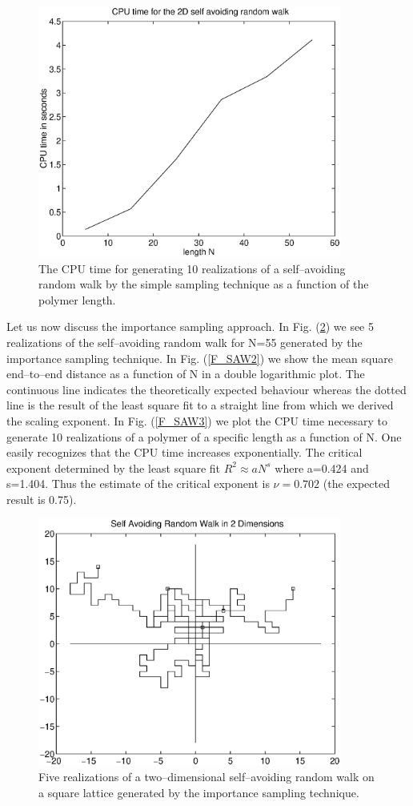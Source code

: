 \begin{figure}
\label{F_SAW3S}
\includegraphics[width=10cm]{./Figures/f_saw3s.eps}
\caption{The CPU time for generating 10 realizations  of a 
self--avoiding random walk  by the simple sampling
technique as a function of the polymer length.}
\end{figure}

Let us now discuss the importance sampling approach.
In Fig. (\ref{F_SAW1}) we see 5 realizations of the self--avoiding 
random walk for N=55 generated by the importance sampling technique. 
In Fig. (\ref{F_SAW2}) we show the mean square end--to--end 
distance as a function of N in a double logarithmic plot. The 
continuous line indicates the theoretically expected behaviour
whereas the dotted line is the result of the least square fit to a 
straight line from which we derived the scaling exponent. In 
Fig. (\ref{F_SAW3}) we plot the CPU time necessary to generate
10 realizations of a polymer of a specific length as a function of 
N. One easily recognizes that the CPU time increases 
exponentially. The critical exponent determined by the least 
square fit $R^2 \approx aN^s$ where a=0.424 and s=1.404.
Thus the estimate of the critical exponent is 
$\nu=0.702$ (the expected result is 0.75).
\begin{figure}
\label{F_SAW1}
\includegraphics[width=10cm]{./Figures/f_saw1.eps}
\caption{Five realizations of a two--dimensional self--avoiding 
random walk on a square lattice generated by the importance sampling 
technique.}
\end{figure}


